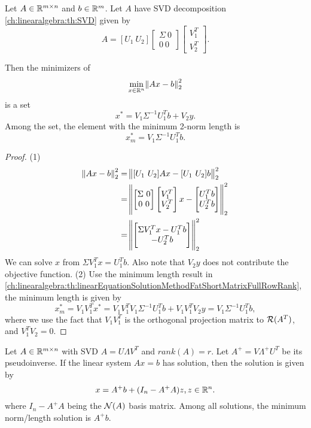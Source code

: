 \begin{refsection}
\begin{lemma}\label{ch:linearalgebra:linearEquationSolutionSVDmethod}
Let $A\in \mathbb{R}^{m\times n}$  and $b\in \mathbb{R}^m$. Let $A$ have SVD decomposition \autoref{ch:linearalgebra:th:SVD} given by
$$
A = [U_1 ~ U_2]\begin{bmatrix}
\Sigma ~ 0\\
0 ~ 0
\end{bmatrix} \begin{bmatrix}
V_1^T\\
V_2^T
\end{bmatrix} 
.$$

Then the minimizers of 
$$\min_{x\in\mathbb{R}^n} \norm{Ax - b}_2^2$$	
is a set
$$x^* = V_1\Sigma^{-1}U_1^T b + V_2y.$$
Among the set, the element with the minimum 2-norm length is
$$x^*_m = V_1\Sigma^{-1}U_1^Tb.$$	
\end{lemma}
\begin{proof}
(1)
\begin{align*}
\norm{Ax - b}_2^2 &= \norm{[U_1~U_2]Ax - [U_1~U_2]b}_2^2 \\
&=\norm{\begin{bmatrix}
	\Sigma ~ 0\\
	0 ~ 0
	\end{bmatrix} \begin{bmatrix}
	V_1^T\\
	V_2^T\end{bmatrix} x - \begin{bmatrix}
	U_1^Tb\\
	U_2^Tb
	\end{bmatrix}}_2^2 \\
&= \norm{\begin{bmatrix}
	\Sigma V_1^T x - U_1^Tb \\
	-U_2^Tb
	\end{bmatrix}}_2^2
\end{align*}	
We can solve $x$ from 	$\Sigma V_1^T x = U_1^Tb$. 
Also note that $V_2y$ does not contribute the objective function.
(2) Use the minimum length result in \autoref{ch:linearalgebra:th:linearEquationSolutionMethodFatShortMatrixFullRowRank}, the minimum length is given by
$$x^*_m = V_1V_1^Tx^* = V_1V_1^TV_1\Sigma^{-1}U_1^Tb + V_1V_1^TV_2y = V_1\Sigma^{-1}U_1^Tb,$$
where we use the fact that $V_1V_1^T$ is the orthogonal projection matrix to $\mathcal{R}(A^T)$, and $V_1^TV_2 = 0$.
\end{proof}


\begin{theorem}
	Let $A \in \mathbb{R}^{m\times n}$ with SVD $A = U\Lambda V^T$ and $rank(A) = r$. Let $A^+  = V \Lambda^+ U^T$ be its pseudoinverse. If the linear system $Ax = b$ has solution, then the solution is given by
	$$x = A^+b + (I_n - A^+A)z, z\in \mathbb{R}^n.$$
	where $I_n - A^+A$ being the $\mathcal{N}(A)$ basis matrix.
	Among all solutions, the minimum norm/length solution is $A^+b$.
	

\end{theorem}
\end{refsection}
